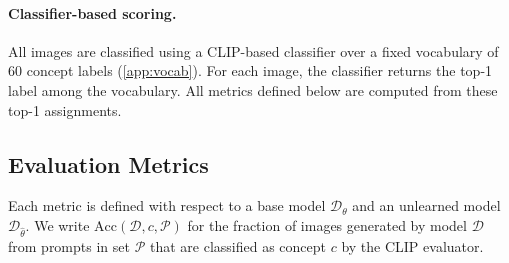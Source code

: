 \paragraph{Classifier-based scoring.}
All images are classified using a CLIP-based classifier over a fixed vocabulary of 60 concept labels (\cref{app:vocab}). For each image, the classifier returns the top-1 label among the vocabulary. All metrics defined below are computed from these top-1 assignments.

\subsection{Evaluation Metrics}
\label{app:metric_defs}
Each metric is defined with respect to a base model 
$\mathcal{D}_\theta$ and an unlearned model 
$\mathcal{D}_{\hat\theta}$. We write $\mathrm{Acc}(\mathcal{D}, c, \mathcal{P})$ for the fraction of images generated by model $\mathcal{D}$ from prompts in set $\mathcal{P}$ that are classified as concept $c$ by the CLIP evaluator.

